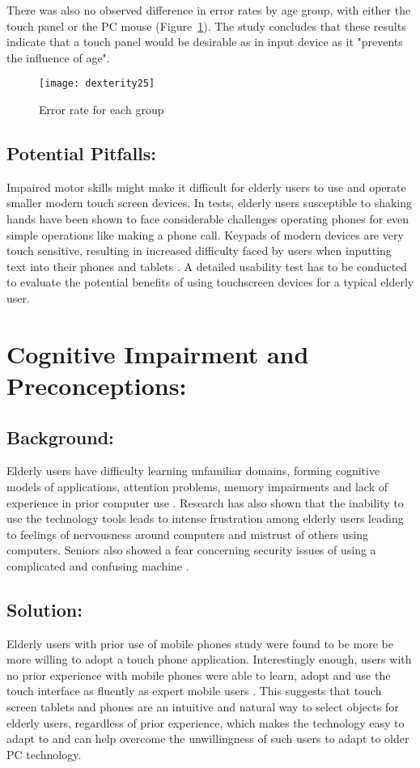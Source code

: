 \documentclass[12pt,draftcls,onecolumn]{IEEEtran}
\begin{document}
There was also no observed difference in error rates by age group, with either the touch panel or the PC mouse (Figure~\ref{dexterity2.5}). The study concludes that these results indicate that a touch panel would be desirable as in input device as it "prevents the influence of age". 
 \begin{figure}[!h]
\centering
\texttt{[image: dexterity25]}
\caption{Error rate for each group}
\label{dexterity2.5}
\end{figure} 

\subsection{Potential Pitfalls:}
Impaired motor skills might make it difficult for elderly users to use and operate smaller modern touch screen devices. In tests, elderly users susceptible to shaking hands have been shown to face considerable challenges operating phones for even simple operations like making a phone call. Keypads of modern devices are very touch sensitive, resulting in increased difficulty faced by users when inputting text into their phones and tablets \cite{haikio2007touch}. A detailed usability test has to be conducted to evaluate the potential benefits of using touchscreen devices for a typical elderly user. 
 
\section{Cognitive Impairment and Preconceptions:}
\subsection{Background:}
Elderly users have difficulty learning unfamiliar domains, forming cognitive models of applications, attention problems, memory impairments and lack of experience in prior computer use \cite{hanson2001web}. Research has also shown that the inability to use the technology tools leads to intense frustration among elderly users leading to feelings of nervousness around computers and mistrust of others using computers. Seniors also showed a fear concerning security issues of using a complicated and confusing machine \cite{wolf2010elderly}. 

\subsection{Solution:}
Elderly users with prior use of mobile phones study were found to be more be more willing to adopt a touch phone application. Interestingly enough, users with no prior experience with mobile phones were able to learn, adopt and use the touch interface as fluently as expert mobile users \cite{haikio2007touch}. This suggests that touch screen tablets and phones are an intuitive and natural way to select objects for elderly users, regardless of prior experience, which makes the technology easy to adapt to and can help overcome the unwillingness of such users to adapt to older PC technology.
\end{document}
